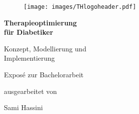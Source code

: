 \documentclass[a4paper, 12pt]{scrartcl}
\begin{document}
\begin{titlepage}
	
	\begin{center}
		
		\begin{figure}[!ht]
			\texttt{[image: images/THlogoheader.pdf]}
		\end{figure}
		
		\vspace{0.8cm}
		
		\begin{rmfamily}
			\begin{huge}
				\textbf{Therapieoptimierung\\ für Diabetiker}\\	
			\end{huge}
			\vspace{0.5cm}
			\begin{LARGE}
				Konzept, Modellierung und\\ Implementierung\\
			\end{LARGE}
		\end{rmfamily}
		
		\vspace{1.6cm}
		
		
		
		\begin{LARGE}
			\begin{scshape}
				Exposé zur Bachelorarbeit\\[0.8em]
			\end{scshape}
		\end{LARGE}
		
		\begin{large}
			ausgearbeitet von\\ 
			\vspace{0.2cm}
			\begin{LARGE}
				Sami Hassini\\
			\end{LARGE}
		\end{large}
		

\end{center}
\end{titlepage}
\end{document}
